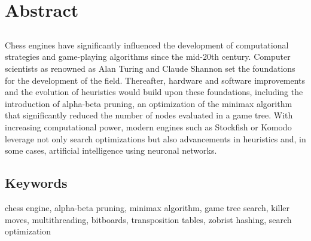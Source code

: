 \chapter*{Abstract}

\section*{\tituloPortadaEngVal}

Chess engines have significantly influenced the development of computational strategies and game-playing algorithms since the mid-20th century. Computer scientists as renowned as Alan Turing and Claude Shannon set the foundations for the development of the field. Thereafter, hardware and software improvements and the evolution of heuristics would build upon these foundations, including the introduction of alpha-beta pruning, an optimization of the minimax algorithm that significantly reduced the number of nodes evaluated in a game tree. With increasing computational power, modern engines such as Stockfish or Komodo leverage not only search optimizations but also advancements in heuristics and, in some cases, artificial intelligence using neuronal networks.

\section*{Keywords}

\noindent chess engine, alpha-beta pruning, minimax algorithm, game tree search, killer moves, multithreading, bitboards, transposition tables, zobrist hashing, search optimization
